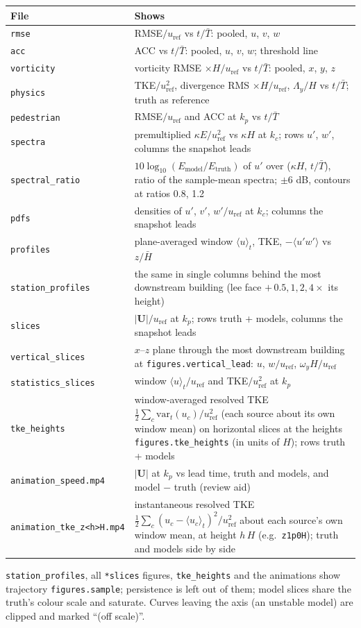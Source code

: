 \documentclass[10pt]{article}
\newcommand{\uref}{u_\mathrm{ref}}
\newcommand{\Tbar}{\bar{T}}
\begin{document}
\noindent\begin{tabularx}{\linewidth}{@{}lX@{}}
\toprule
File & Shows \\
\midrule
\texttt{rmse} & RMSE$/\uref$ vs $t/\Tbar$: pooled, $u$, $v$, $w$ \\
\texttt{acc} & ACC vs $t/\Tbar$: pooled, $u$, $v$, $w$; threshold line \\
\texttt{vorticity} & vorticity RMSE $\times H/\uref$ vs $t/\Tbar$: pooled, $x$, $y$, $z$ \\
\texttt{physics} & TKE$/\uref^2$, divergence RMS $\times H/\uref$, $\Lambda_y/H$ vs $t/\Tbar$; truth as reference \\
\texttt{pedestrian} & RMSE$/\uref$ and ACC at $k_p$ vs $t/\Tbar$ \\
\texttt{spectra} & premultiplied $\kappa E/\uref^2$ vs $\kappa H$ at $k_c$; rows $u'$, $w'$, columns the snapshot leads \\
\texttt{spectral\_ratio} & $10\log_{10}(E_\text{model}/E_\text{truth})$ of $u'$ over ($\kappa H$, $t/\Tbar$), ratio of the sample-mean spectra; $\pm6$ dB, contours at ratios 0.8, 1.2 \\
\texttt{pdfs} & densities of $u'$, $v'$, $w'/\uref$ at $k_c$; columns the snapshot leads \\
\texttt{profiles} & plane-averaged window $\langle u\rangle_t$, TKE, $-\langle u'w'\rangle$ vs $z/\bar H$ \\
\texttt{station\_profiles} & the same in single columns behind the most downstream building (lee face $+\,0.5, 1, 2, 4\times$ its height) \\
\texttt{slices} & $|\mathbf{U}|/\uref$ at $k_p$; rows truth + models, columns the snapshot leads \\
\texttt{vertical\_slices} & $x$--$z$ plane through the most downstream building at \texttt{figures.vertical\_lead}: $u$, $w/\uref$, $\omega_y H/\uref$ \\
\texttt{statistics\_slices} & window $\langle u\rangle_t/\uref$ and TKE$/\uref^2$ at $k_p$ \\
\texttt{tke\_heights} & window-averaged resolved TKE $\tfrac12\sum_c\mathrm{var}_t(u_c)/\uref^2$ (each source about its own window mean) on horizontal slices at the heights \texttt{figures.tke\_heights} (in units of $H$); rows truth + models \\
\texttt{animation\_speed.mp4} & $|\mathbf{U}|$ at $k_p$ vs lead time, truth and models, and model $-$ truth (review aid) \\
\texttt{animation\_tke\_z<h>H.mp4} & instantaneous resolved TKE $\tfrac12\sum_c(u_c - \langle u_c\rangle_t)^2/\uref^2$ about each source's own window mean, at height $h\,H$ (e.g.\ \texttt{z1p0H}); truth and models side by side \\
\bottomrule
\end{tabularx}

\texttt{station\_profiles}, all \texttt{*slices} figures, \texttt{tke\_heights}
and the animations show trajectory \texttt{figures.sample}; persistence is left
out of them; model slices
share the truth's colour scale and saturate. Curves leaving the axis (an
unstable model) are clipped and marked ``(off scale)''.
\end{document}
